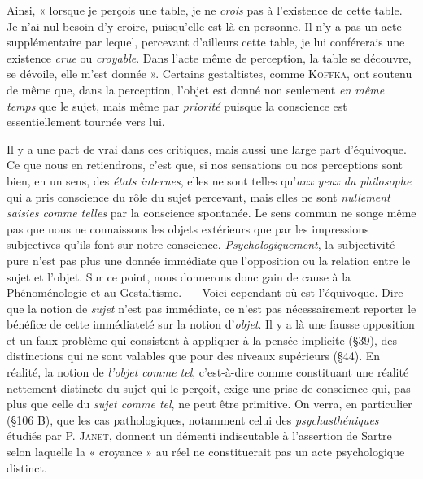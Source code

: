 Ainsi, « lorsque je perçois une table, je ne {\it crois} pas à l’existence de
cette table. Je n’ai nul besoin d’y croire, puisqu’elle est là en personne.
Il n’y a pas un acte supplémentaire par lequel, percevant d’ailleurs
cette table, je lui conférerais une existence {\it crue} ou {\it croyable}. Dans
l’acte même de perception, la table se découvre, se dévoile, elle m’est
donnée ». Certains gestaltistes, comme \textsc{Koffka}, ont soutenu de même
que, dans la perception, l’objet est donné non seulement {\it en même
temps} que le sujet, mais même par {\it priorité} puisque la conscience est
essentiellement tournée vers lui.

Il y a une part de vrai dans ces critiques, mais aussi une large
part d’équivoque. Ce que nous en retiendrons, c’est que, si nos sensations
ou nos perceptions sont bien, en un sens, des {\it états internes}, elles
ne sont telles qu’{\it aux yeux du philosophe} qui a pris conscience du rôle
du sujet percevant, mais elles ne sont {\it nullement saisies comme telles}
par la conscience spontanée. Le sens commun ne songe même pas
que nous ne connaissons les objets extérieurs que par les impressions
subjectives qu’ils font sur notre conscience. {\it Psychologiquement}, la
subjectivité pure n’est pas plus une donnée immédiate que l’opposition
ou la relation entre le sujet et l’objet. Sur ce point, nous donnerons
donc gain de cause à la Phénoménologie et au Gestaltisme. {\bf —}
Voici cependant où est l’équivoque. Dire que la notion de {\it sujet} n’est
pas immédiate, ce n’est pas nécessairement reporter le bénéfice de
cette immédiateté sur la notion d’{\it objet}. Il y a là une fausse opposition
et un faux problème qui consistent à appliquer à la pensée implicite
(\S 39), des distinctions qui ne sont valables que pour des niveaux
supérieurs (\S 44). En réalité, la notion de {\it l’objet comme tel}, c’est-à-dire
comme constituant une réalité nettement distincte du sujet qui
le perçoit, exige une prise de conscience qui, pas plus que celle du {\it sujet
comme tel}, ne peut être primitive. On verra, en particulier (\S 106 B),
que les cas pathologiques, notamment celui des {\it psychasthéniques}
étudiés par P. \textsc{Janet}, donnent un démenti indiscutable à l’assertion
de Sartre selon laquelle la « croyance » au réel ne constituerait pas
un acte psychologique distinct.

